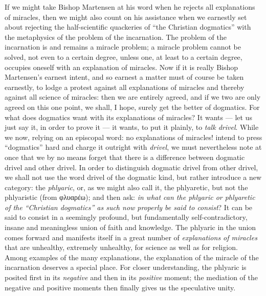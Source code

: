 \documentclass[12pt]{book}
\newcommand{\opage}[1]{\marginnote{\footnotesize\textit{[#1]}}}
\begin{document}
If we might take Bishop Martensen at his word when he rejects all explanations of miracles, then we might also count on his assistance when we earnestly set about rejecting the half-scientific quackeries of ``the Christian dogmatics'' with the metaphysics of the problem of the incarnation. The problem of the incarnation is and remains a miracle problem; a miracle problem cannot be solved, not even to a certain degree, unless one, at least to a certain degree, occupies oneself with an explanation of miracles. Now if it is really Bishop Martensen's earnest intent, and so earnest a matter must of course be taken earnestly, to lodge a protest against all explanations of miracles and thereby against all science of miracles: then we are entirely agreed, and if we two are only agreed on this one point, we shall, I hope, surely get the better of dogmatics. For what does dogmatics want with its explanations of miracles? It wants --- let us just say it, in order to prove it --- it wants, to put it plainly, to \emph{talk drivel}. While we now, relying on an episcopal word: no explanations of miracles! intend to press ``dogmatics'' hard and charge it outright with \emph{drivel}, we must nevertheless note at once that we by no means forget that there is a difference between dogmatic drivel and other drivel. In order to distinguish dogmatic drivel from other drivel, we shall not use the word drivel of the dogmatic kind, but rather introduce a new category: the \emph{phlyaric}, or, as we might also call it, the phlyaretic, but not the phlyaristic (from φλυαρέω); and then ask: \emph{in what can the phlyaric or phlyaretic of the ``Christian dogmatics'' as such now properly be said to consist}? It can be said to consist in a seemingly profound, but fundamentally self-contradictory, insane and meaningless union of faith and knowledge. The phlyaric in the union
\opage{91}\setcounter{footnote}{0}%
comes forward and manifests itself in a great number of \emph{explanations of miracles} that are unhealthy, extremely unhealthy, for science as well as for religion. Among examples of the many explanations, the explanation of the miracle of the incarnation deserves a special place. For closer understanding, the phlyaric is posited first in its \emph{negative} and then in its \emph{positive} moment; the mediation of the negative and positive moments then finally gives us the speculative unity.
\end{document}
